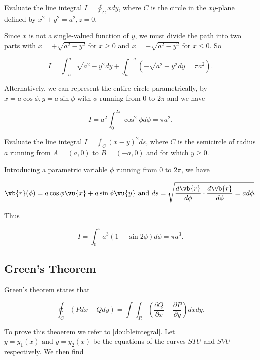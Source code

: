 \documentclass[english,a4paper,12pt]{report}
\begin{document}
{Evaluate the line integral \(I = \oint_{C} x dy\), where \(C\) is the circle in the \(xy\)-plane defined by \(x^2 + y^2 = a^2, z=0\). }
{Since \(x\) is not a single-valued function of \(y\), we must divide the path into two parts with \(x = +\sqrt{a^2-y^2} \) for \(x\geq 0\) and \(x = -\sqrt{a^2-y^2} \) for \(x \le 0\). So

\begin{equation}
	I = \int_{-a}^{a} \sqrt{a^2-y^2}dy + \int_{a}^{-a} (-\sqrt{a^2-y^2}dy= \pi a^2 )   .
\end{equation}

Alternatively, we can represent the entire circle parametrically, by \(x = a \cos \phi , y = a \sin \phi \) with \(\phi \) running from \(0\) to \(2 \pi \) and we have 

\begin{equation}
	I = a^2 \int_{0}^{2\pi } \cos ^2 \phi d\phi  = \pi a^2.
\end{equation}
} 

{Evaluate the line integral \(I = \int_{C}^{} (x-y)^2 ds \), where \(C\) is the semicircle of radius \(a\) running from \(A = (a,0)\) to \(B = (-a,0)\) and for which \(y \ge 0\).}
{Introducing a parametric variable \(\phi \) running from \(0\) to \(2\pi \), we have 

\begin{equation}
	\vb{r} (\phi ) = a \cos \phi \vu{x} + a \sin \phi \vu{y} \text { and } ds = \sqrt{\frac{d \vb{r} }{d\phi }\cdot \frac{d \vb{r} }{d\phi } = a d\phi}. 
\end{equation}

Thus

\begin{equation}
	I = \int_{0}^{\pi } a^3 (1-\sin 2\phi ) d\phi = \pi a^3 . 
\end{equation}
} 

\subsection{Green's Theorem}

Green's theorem states that 

\begin{equation}
	\oint_{C} (Pdx + Qdy) = \int \int_{R}^{} \left( \frac{\partial Q}{\partial x} - \frac{\partial P}{\partial y}  \right) dxdy.  
\end{equation}

To prove this theoerem we refer to \cref{doubleintegral}. Let \(y = y_1 (x) \text { and } y = y_2 (x)\) be the equations of the curves \(STU\) and \(SVU\) respectively. We then find
\end{document}
